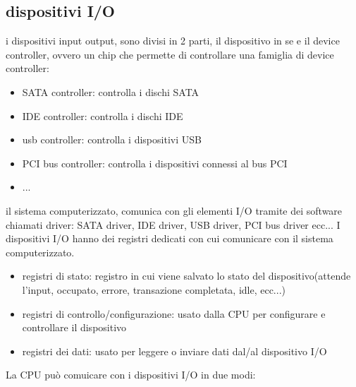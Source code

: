 \documentclass{article}
\begin{document}
    \subsection{dispositivi I/O}
    i dispositivi input output, sono divisi in 2 parti, il dispositivo in se e il device controller, ovvero un chip che permette di controllare una famiglia di device controller:
    \begin{itemize}
        \item SATA controller: controlla i dischi SATA
        \item IDE controller: controlla i dischi IDE
        \item usb controller: controlla i dispositivi USB
        \item PCI bus controller: controlla i dispositivi connessi al bus PCI
        \item ...
    \end{itemize}
    il sistema computerizzato, comunica con gli elementi I/O tramite dei software chiamati driver: SATA driver, IDE driver, USB driver, PCI bus driver ecc... I dispositivi I/O hanno dei registri dedicati con cui comunicare con il sistema computerizzato.
    \begin{itemize}
        \item registri di stato: registro in cui viene salvato lo stato del dispositivo(attende l'input, occupato, errore, transazione completata, idle, ecc...)
        \item registri di controllo/configurazione: usato dalla CPU per configurare e controllare il dispositivo
        \item registri dei dati: usato per leggere o inviare dati dal/al dispositivo I/O
    \end{itemize}
    La CPU può comuicare con i dispositivi I/O in due modi:
\end{document}
